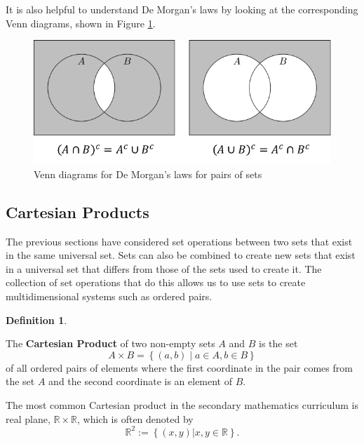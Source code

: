 \documentclass[
]{book}
\theoremstyle{definition}
\newtheorem{definition}{Definition}[chapter]
\theoremstyle{definition}
\theoremstyle{definition}
\theoremstyle{definition}
\theoremstyle{remark}
\begin{document}
It is also helpful to understand De Morgan's laws by looking at the corresponding Venn diagrams, shown in Figure \ref{fig:demorgan}.

\begin{figure}

{\centering \includegraphics[width=0.8\linewidth]{tikz/demorgan} 

}

\caption{Venn diagrams for De Morgan's laws for pairs of sets}\label{fig:demorgan}
\end{figure}

\hypertarget{subsec:cartesian}{%
\subsection{Cartesian Products}\label{subsec:cartesian}}

The previous sections have considered set operations between two sets that exist in the same universal set. Sets can also be combined to create new sets that exist in a universal set that differs from those of the sets used to create it. The collection of set operations that do this allows us to use sets to create multidimensional systems such as ordered pairs.

\begin{definition}
\protect\hypertarget{def:cartesian-product}{}\label{def:cartesian-product}

The \textbf{Cartesian Product} of two non-empty sets \(A\) and \(B\) is the set
\[A\times B = \left\{ (a,b) \middle \vert a \in A, b\in B\right\}\] of all ordered pairs of elements where the first coordinate in the pair comes from the set \(A\) and the second coordinate is an element of \(B\).

\end{definition}

The most common Cartesian product in the secondary mathematics curriculum is real plane, \(\mathbb{R} \times \mathbb{R}\), which is often denoted by \[\mathbb{R}^2:= \left\{ (x,y) \vert x,y\in \mathbb{R} \right\}.\]
\end{document}
